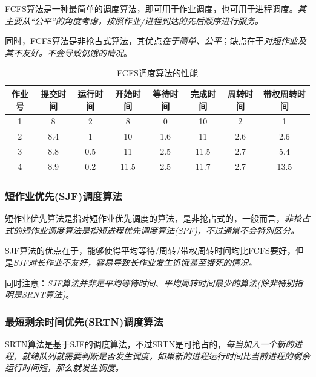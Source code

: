     FCFS算法是一种最简单的调度算法，即可用于作业调度，也可用于进程调度。\emph{其主要从“公平”的角度考虑，按照作业/进程到达的先后顺序进行服务。}

    同时，FCFS算法是非抢占式算法，其优点\emph{在于简单、公平}；缺点在于\emph{对短作业及其不友好。}\emph{\color{red}不会导致饥饿的情况}。

\begin{table}[!htbp]
    \begin{center}
        \caption{FCFS调度算法的性能}
        \begin{tabular}{c | c | c | c | c | c | c | c }
            \hline
            作业号 & 提交时间 & 运行时间 & 开始时间 & 等待时间 & 完成时间 & 周转时间 & 带权周转时间 \\
            \hline
            1 & 8 & 2 & 8 & 0 & 10 & 2 & 1 \\
            \hline
            2 & 8.4 & 1 & 10 & 1.6 & 11 & 2.6 & 2.6 \\
            \hline
            3 & 8.8 & 0.5 & 11 & 2.5 & 11.5 & 2.7 & 5.4 \\
            \hline
            4 & 8.9 & 0.2 & 11.5 & 2.5 & 11.7 & 2.7 & 13.5 \\
            \hline
        \end{tabular}
    \end{center}
\end{table}

\subsubsection{短作业优先(SJF)调度算法}

    短作业优先算法是指对短作业优先调度的算法，是非抢占式的，一般而言，\emph{非抢占式的短作业调度算法是指短进程优先调度算法(SPF)，不过通常不会特别区分。}

    SJF算法的优点在于，能够使得平均等待/周转/带权周转时间均比FCFS要好，但是\emph{SJF对长作业不友好，容易导致长作业发生饥饿甚至饿死的情况。}

    同时注意：\emph{SJF算法并非是平均等待时间、平均周转时间最少的算法(\color{red}除非特别指明是SRNT算法)}。

\subsubsection{最短剩余时间优先(SRTN)调度算法}

    SRTN算法是基于SJF的调度算法，不过SRTN是{\color{red}可抢占的}，\emph{每当加入一个新的进程，就绪队列就需要判断是否发生调度，如果新的进程运行时间比当前进程的剩余运行时间短，那么就发生调度。}

